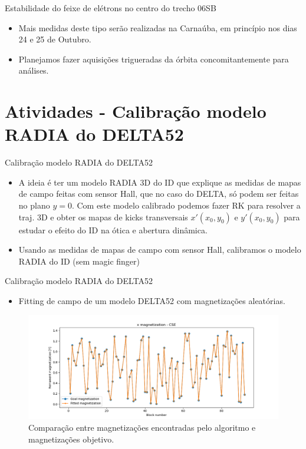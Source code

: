 \documentclass{beamer}					%
\begin{document}
\begin{frame}{Estabilidade do feixe de elétrons no centro do trecho 06SB}
    
    \begin{itemize}
		\item Mais medidas deste tipo serão realizadas na Carnaúba, em princípio nos dias 24 e 25 de Outubro. 
        \item Planejamos fazer aquisições trigueradas da órbita concomitantemente para análises.
	\end{itemize}
    
\end{frame}



\section{Atividades - Calibração modelo RADIA do DELTA52}

\begin{frame}{Calibração modelo RADIA do DELTA52}
    \begin{itemize}
		\item A ideia é ter um modelo RADIA 3D do ID que explique as medidas de mapas de campo feitas com sensor Hall, que no caso do DELTA, só podem ser feitas no plano $y = 0$. Com este modelo calibrado podemos fazer RK para resolver a traj. 3D e obter os mapas de kicks transversais $x'(x_0, y_0)$ e $y'(x_0, y_0)$ para estudar o efeito do ID na ótica e abertura dinâmica.
        \item Usando as medidas de mapas de campo com sensor Hall, calibramos o modelo RADIA do ID (sem magic finger)
	\end{itemize}
\end{frame}

\begin{frame}{Calibração modelo RADIA do DELTA52}
\begin{itemize}
        \item Fitting de campo de um modelo DELTA52 com magnetizações aleatórias.
	\end{itemize}
\begin{figure}[H]
		\centering
        \includegraphics[width=.9\textwidth]{figures/mag_fitting.png}
        \caption{Comparação entre magnetizações encontradas pelo algoritmo e magnetizações objetivo.}
        \label{fig:mag_fitting}
    \end{figure}
\end{frame}
\end{document}
